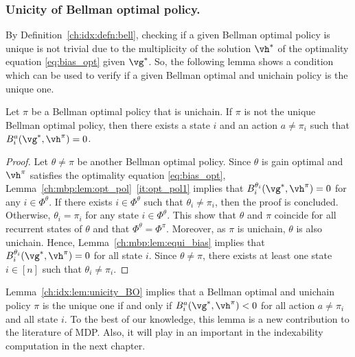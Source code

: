 \subsubsection{Unicity of Bellman optimal policy.}
\label{ch:idx:sssec:unicity}

By Definition~\ref{ch:idx:defn:bell}, checking if a given Bellman optimal policy is unique is not trivial due to the multiplicity of the solution $\vh^*$ of the optimality equation \eqref{eq:bias_opt} given $\vg^*$.
So, the following lemma shows a condition which can be used to verify if a given Bellman optimal and unichain policy is the unique one.
\begin{lem}
    \label{ch:idx:lem:unicity_BO}
    Let $\pi$ be a Bellman optimal policy that is unichain. If $\pi$ is not the unique Bellman optimal policy, then there exists a state $i$ and an action $a\neq\pi_i$ such that $B_i^a(\vg^*,\vh^\pi)=0$.
\end{lem}

\begin{proof}
    Let $\theta\neq\pi$ be another Bellman optimal policy.
    Since $\theta$ is gain optimal and $\vh^\pi$ satisfies the optimality equation \eqref{eq:bias_opt}, Lemma~\ref{ch:mbp:lem:opt_pol}~\ref{it:opt_pol1} implies that $B_i^{\theta_i}(\vg^*,\vh^\pi) =0$ for any $i\in\Phi^\theta$.
    If there exists $i\in\Phi^\theta$ such that $\theta_i\neq\pi_i$, then the proof is concluded.
    Otherwise, $\theta_i=\pi_i$ for any state $i\in\Phi^\theta$.
    This show that $\theta$ and $\pi$ coincide for all recurrent states of $\theta$ and that $\Phi^\theta=\Phi^\pi$.
    Moreover, as $\pi$ is unichain, $\theta$ is also unichain.
    Hence, Lemma~\ref{ch:mbp:lem:equi_bias} implies that $B_i^{\theta_i}(\vg^*, \vh^\pi)=0$ for all state $i$.
    Since $\theta\neq\pi$, there exists at least one state $i\in[n]$ such that $\theta_i\neq\pi_i$.
\end{proof}
Lemma~\ref{ch:idx:lem:unicity_BO} implies that a Bellman optimal and unichain policy $\pi$ is the unique one if and only if $B_i^a(\vg^*, \vh^\pi)<0$ for all action $a\neq\pi_i$ and all state $i$.
To the best of our knowledge, this lemma is a new contribution to the literature of MDP.
Also, it will play in an important in the indexability computation in the next chapter.


